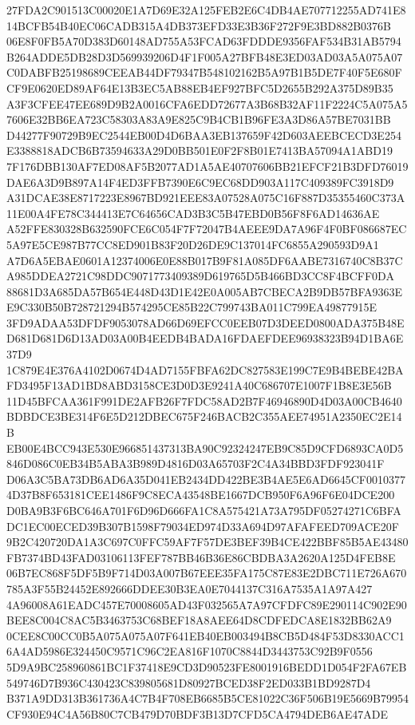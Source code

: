 \documentclass[UTF8,fontset=fandol,zihao=-4,a4paper]{ctexart}
\begin{document}
{{27FDA2C901513C00020E1A7D69E32A125FEB2E6C4DB4AE707712255AD741E814BCFB54B40EC06CADB315A4DB373EFD33E3B36F272F9E3BD882B0376B
06E8F0FB5A70D383D60148AD755A53FCAD63FDDDE9356FAF534B31AB5794B264ADDE5DB28D3D569939206D4F1F005A27BFB48E3ED03AD03A5A075A07
C0DABFB25198689CEEAB44DF79347B548102162B5A97B1B5DE7F40F5E680FCF9E0620ED89AF64E13B3EC5AB88EB4EF927BFC5D2655B292A375D89B35
A3F3CFEE47EE689D9B2A0016CFA6EDD72677A3B68B32AF11F2224C5A075A57606E32BB6EA723C58303A83A9E825C9B4CB1B96FE3A3D86A57BE7031BB
D44277F90729B9EC2544EB00D4D6BAA3EB137659F42D603AEEBCECD3E254E3388818ADCB6B73594633A29D0BB501E0F2F8B01E7413BA57094A1ABD19
7F176DBB130AF7ED08AF5B2077AD1A5AE40707606BB21EFCF21B3DFD76019DAE6A3D9B897A14F4ED3FFB7390E6C9EC68DD903A117C409389FC3918D9
A31DCAE38E8717223E8967BD921EEE83A07528A075C16F887D35355460C373A11E00A4FE78C344413E7C64656CAD3B3C5B47EBD0B56F8F6AD14636AE
A52FFE830328B632590FCE6C054F7F72047B4AEEE9DA7A96F4F0BF086687EC5A97E5CE987B77CC8ED901B83F20D26DE9C137014FC6855A290593D9A1
A7D6A5EBAE0601A12374006E0E88B017B9F81A085DF6AABE7316740C8B37CA985DDEA2721C98DDC9071773409389D619765D5B466BD3CC8F4BCFF0DA
88681D3A685DA57B654E448D43D1E42E0A005AB7CBECA2B9DB57BFA9363EE9C330B50B728721294B574295CE85B22C799743BA011C799EA49877915E
3FD9ADAA53DFDF9053078AD66D69EFCC0EEB07D3DEED0800ADA375B48ED681D681D6D13AD03A00B4EEDB4BADA16FDAEFDEE96938323B94D1BA6E37D9
1C879E4E376A4102D0674D4AD7155FBFA62DC827583E199C7E9B4BEBE42BAFD3495F13AD1BD8ABD3158CE3D0D3E9241A40C686707E1007F1B8E3E56B
11D45BFCAA361F991DE2AFB26F7FDC58AD2B7F46946890D4D03A00CB4640BDBDCE3BE314F6E5D212DBEC675F246BACB2C355AEE74951A2350EC2E14B
EB00E4BCC943E530E966851437313BA90C92324247EB9C85D9CFD6893CA0D5846D086C0EB34B5ABA3B989D4816D03A65703F2C4A34BBD3FDF923041F
D06A3C5BA73DB6AD6A35D041EB2434DD422BE3B4AE5E6AD6645CF00103774D37B8F653181CEE1486F9C8ECA43548BE1667DCB950F6A96F6E04DCE200
D0BA9B3F6BC646A701F6D96D666FA1C8A575421A73A795DF05274271C6BFADC1EC00ECED39B307B1598F79034ED974D33A694D97AFAFEED709ACE20F
9B2C420720DA1A3C697C0FFC59AF7F57DE3BEF39B4CE422BBF85B5AE43480FB7374BD43FAD03106113FEF787BB46B36E86CBDBA3A2620A125D4FEB8E
06B7EC868F5DF5B9F714D03A007B67EEE35FA175C87E83E2DBC711E726A670785A3F55B24452E892666DDEE30B3EA0E7044137C316A7535A1A97A427
4A96008A61EADC457E70008605AD43F032565A7A97CFDFC89E290114C902E90BEE8C004C8AC5B3463753C68BEF18A8AEE64D8CDFEDCA8E1832BB62A9
0CEE8C00CC0B5A075A075A07F641EB40EB003494B8CB5D484F53D8330ACC16A4AD5986E324450C9571C96C2EA816F1070C8844D3443753C92B9F0556
5D9A9BC258960861BC1F37418E9CD3D90523FE8001916BEDD1D054F2FA67EB549746D7B936C430423C839805681D80927BCED38F2ED033B1BD9287D4
B371A9DD313B361736A4C7B4F708EB6685B5CE81022C36F506B19E5669B79954CF930E94C4A56B80C7CB479D70BDF3B13D7CFD5CA4794DEB6AE47ADE
}}
\end{document}
